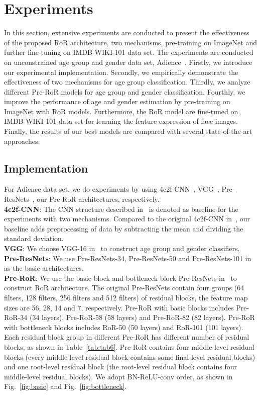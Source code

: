 \documentclass[journal]{IEEEtran}
\begin{document}
\section{Experiments}\label{sec4}
In this section, extensive experiments are conducted to present the effectiveness of the proposed RoR architecture, two mechanisms, pre-training on ImageNet and further fine-tuning on IMDB-WIKI-101 data set. The experiments are conducted on unconstrained age group and gender data set, Adience~\cite{AgeSVMdrop}. Firstly, we introduce our experimental implementation. Secondly, we empirically demonstrate the effectiveness of two mechanisms for age group classification. Thirdly, we analyze different Pre-RoR models for age group and gender classification. Fourthly, we improve the performance of age and gender estimation by pre-training on ImageNet with RoR models. Furthermore, the RoR model are fine-tuned on IMDB-WIKI-101 data set for learning the feature expression of face images. Finally, the results of our best models are compared with several state-of-the-art approaches.
\subsection{Implementation}
For Adience data set, we do experiments by using 4c2f-CNN~\cite{Agegenderbycnn}, VGG~\cite{simonyan2014vgg}, Pre-ResNets~\cite{he2016preresnets}, our Pre-RoR architectures, respectively. \\
\textbf{4c2f-CNN}: The CNN structure described in~\cite{Agegenderbycnn} is denoted as baseline for the experiments with two mechanisms. Compared to the original 4c2f-CNN in~\cite{Agegenderbycnn}, our baseline adds preprocessing of data by subtracting the mean and dividing the standard deviation. 
\\\textbf{VGG}: We choose VGG-16 in~\cite{simonyan2014vgg} to construct age group and gender classifiers.
\\\textbf{Pre-ResNets}: We use Pre-ResNets-34, Pre-ResNets-50 and Pre-ResNets-101 in~\cite{he2016preresnets} as the basic architectures.
\\\textbf{Pre-RoR}: We use the basic block and bottleneck block Pre-ResNets in~\cite{he2016preresnets} to construct RoR architecture. The original Pre-ResNets contain four groups (64 filters, 128 filters, 256 filters and 512 filters) of residual blocks, the feature map sizes are 56, 28, 14 and 7, respectively. Pre-RoR with basic blocks includes Pre-RoR-34 (34 layers), Pre-RoR-58 (58 layers) and Pre-RoR-82 (82 layers). Pre-RoR with bottleneck blocks includes RoR-50 (50 layers) and RoR-101 (101 layers). Each residual block group in different Pre-RoR has different number of residual blocks, as shown in Table~\ref{tab:tab6}. Pre-RoR contains four middle-level residual blocks (every middle-level residual block contains some final-level residual blocks) and one root-level residual block (the root-level residual block contains four middle-level residual blocks). We adopt BN-ReLU-conv order, as shown in Fig.~\ref{fig:basic} and Fig.~\ref{fig:bottleneck}. 
\end{document}

